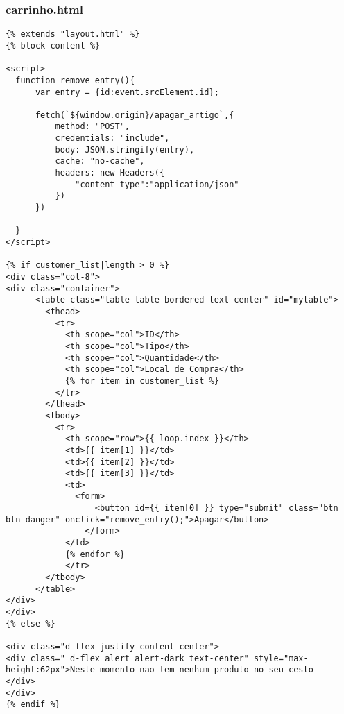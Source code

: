 \documentclass{report}
\begin{document}
\subsubsection{carrinho.html}
\begin{lstlisting}
{% extends "layout.html" %}
{% block content %}

<script>
  function remove_entry(){
      var entry = {id:event.srcElement.id};

      fetch(`${window.origin}/apagar_artigo`,{
          method: "POST",
          credentials: "include",
          body: JSON.stringify(entry),
          cache: "no-cache",
          headers: new Headers({
              "content-type":"application/json"
          })
      })

  }
</script>

{% if customer_list|length > 0 %}
<div class="col-8">
<div class="container">
      <table class="table table-bordered text-center" id="mytable">
        <thead>
          <tr>
            <th scope="col">ID</th>
            <th scope="col">Tipo</th>
            <th scope="col">Quantidade</th>
            <th scope="col">Local de Compra</th>
            {% for item in customer_list %}
          </tr>
        </thead>
        <tbody>
          <tr>
            <th scope="row">{{ loop.index }}</th>
            <td>{{ item[1] }}</td>
            <td>{{ item[2] }}</td>
            <td>{{ item[3] }}</td>
            <td>
              <form>
                  <button id={{ item[0] }} type="submit" class="btn btn-danger" onclick="remove_entry();">Apagar</button>
                </form>
            </td>
            {% endfor %}
            </tr>
        </tbody>
      </table>
</div>
</div>
{% else %}

<div class="d-flex justify-content-center">
<div class=" d-flex alert alert-dark text-center" style="max-height:62px">Neste momento nao tem nenhum produto no seu cesto
</div>
</div>
{% endif %}



\end{lstlisting}
\end{document}
